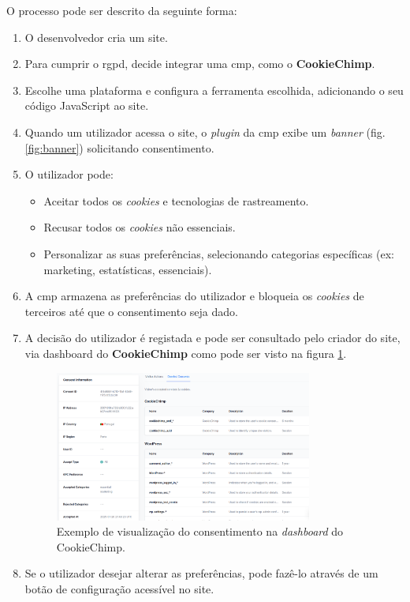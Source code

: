 \newpage

O processo pode ser descrito da seguinte forma:

\begin{enumerate}
    \item O desenvolvedor cria um site.
    \item Para cumprir o \acrshort{rgpd}, decide integrar uma \acrshort{cmp}, como o \textbf{CookieChimp}.
    \item Escolhe uma plataforma e configura a ferramenta escolhida, adicionando o seu código JavaScript ao site.
    \item Quando um utilizador acessa o site, o \textit{plugin} da \acrshort{cmp} exibe um \textit{banner} (fig. \ref{fig:banner}) solicitando consentimento.
    \item O utilizador pode:
          \begin{itemize}
              \item Aceitar todos os \textit{cookies} e tecnologias de rastreamento.
              \item Recusar todos os \textit{cookies} não essenciais.
              \item Personalizar as suas preferências, selecionando categorias específicas (ex: marketing, estatísticas, essenciais).
          \end{itemize}
    \item A \acrshort{cmp} armazena as preferências do utilizador e bloqueia os \textit{cookies} de terceiros até que o consentimento seja dado.
    \item A decisão do utilizador é registada e pode ser consultado pelo criador do site, via dashboard do \textbf{CookieChimp} como pode ser visto na figura \ref{fig:dashboard-visualizacao}.
    \begin{figure}[h]
    \begin{center}
	\includegraphics[width=0.8\textwidth]{images/consent.png}
    \end{center}
    \caption{Exemplo de visualização do consentimento na \textit{dashboard} do CookieChimp.}
    \label{fig:dashboard-visualizacao}
    \end{figure}
    \newpage
    \item Se o utilizador desejar alterar as preferências, pode fazê-lo através de um botão de configuração acessível no site.
\end{enumerate}


